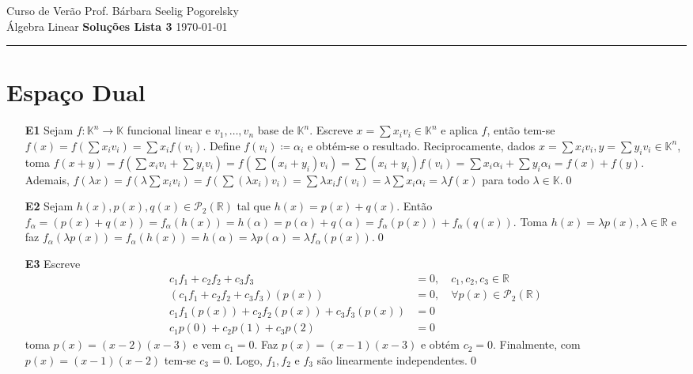 \documentclass{article}
\begin{document}
\noindent
Curso de Verão \hfill Prof. Bárbara Seelig Pogorelsky \\
\noindent
Álgebra Linear \hfill \textbf{\Large Soluções Lista 3} \hfill \today
\vspace{0.5mm}
\hrule

\section*{Espaço Dual}

\begin{enumerate}
    \item [\textbf{E1}] Sejam \(f: \mathbb{K}^n \to \mathbb{K}\) funcional linear e \(v_1, \ldots, v_n\) base de \(\mathbb{K}^n\). Escreve \(x = \sum x_i v_i \in \mathbb{K}^n\) e aplica \(f\), então tem-se \(f(x) = f(\sum x_i v_i) = \sum x_i f(v_i)\). Define \(f(v_i) \coloneq \alpha_i\) e obtém-se o resultado.
        Reciprocamente, dados \(x = \sum x_i v_i, y = \sum y_i v_i \in \mathbb{K}^n\), toma \(f(x+y) = f\left(\sum x_i v_i + \sum y_i v_i\right) = f\left(\sum (x_i+y_i) v_i\right) = \sum (x_i+y_i) f(v_i) = \sum x_i \alpha_i + \sum y_i \alpha_i = f(x) + f(y)\). Ademais, \(f(\lambda x) = f\left(\lambda\sum x_i v_i\right) = f\left(\sum(\lambda x_i) v_i\right) = \sum \lambda x_i f(v_i) = \lambda \sum x_i \alpha_i = \lambda f(x)\) para todo \(\lambda \in \mathbb{K}\).\qed
    \item [\textbf{E2}] Sejam \(h(x), p(x), q(x) \in \mathcal{P}_2(\mathbb{R})\) tal que \(h(x) = p(x) + q(x)\). Então \(f_\alpha = (p(x)+q(x)) = f_\alpha(h(x)) = h(\alpha) = p(\alpha) + q(\alpha) = f_\alpha(p(x)) + f_\alpha(q(x))\). Toma \(h(x) = \lambda p(x), \lambda \in \mathbb{R}\) e faz \(f_\alpha(\lambda p(x)) = f_\alpha(h(x)) = h(\alpha) = \lambda p(\alpha) = \lambda f_\alpha(p(x))\).\qed
    \item [\textbf{E3}] Escreve \begin{align}
        c_1 f_1 + c_2 f_2 + c_3 f_3 &= 0, \quad c_1, c_2, c_3 \in \mathbb{R} \\
        (c_1 f_1 + c_2 f_2 + c_3 f_3)(p(x)) &= 0, \quad \forall p(x) \in \mathcal{P}_2(\mathbb{R}) \\
        c_1 f_1(p(x)) + c_2 f_2(p(x)) + c_3 f_3(p(x)) &= 0 \\
        c_1 p(0) + c_2 p(1) + c_3 p(2) &= 0
    \end{align}
    toma \(p(x) = (x-2)(x-3)\) e vem \(c_1 = 0\). Faz \(p(x) = (x-1)(x-3)\) e obtém \(c_2 = 0\). Finalmente, com \(p(x) = (x-1)(x-2)\) tem-se \(c_3 = 0\). Logo, \(f_1, f_2\) e \(f_3\) são linearmente independentes.\qed

\end{enumerate}
\end{document}
